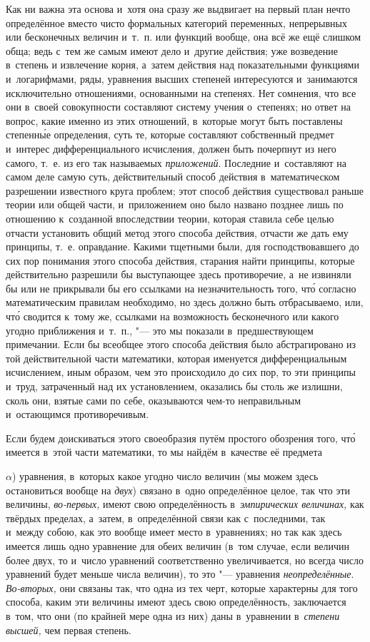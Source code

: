 Как ни важна эта основа и~хотя она сразу же выдвигает на первый план нечто
определённое вместо чисто формальных категорий переменных, непрерывных или
бесконечных величин и~т.~п. или функций вообще, она всё же ещё слишком обща;
ведь с~тем же самым имеют дело и~другие действия; уже возведение в~степень и
извлечение корня, а~затем действия над показательными функциями и~логарифмами,
ряды, уравнения высших степеней интересуются и~занимаются исключительно
отношениями, основанными на степенях. Нет сомнения, что все они в~своей
совокупности составляют систему учения о~степенях; но ответ на вопрос, какие
именно из этих отношений, в~которые могут быть поставлены степенн\'{ы}е
определения, суть те, которые составляют собственный предмет и~интерес
дифференциального исчисления, должен быть почерпнут из него самого, т.~е. из
его так называемых {\em приложений}. Последние и~составляют на самом деле самую
суть, действительный способ действия в~математическом разрешении известного
круга проблем; этот способ действия существовал раньше теории или общей части,
и~приложением оно было названо позднее лишь по отношению к~созданной
впоследствии теории, которая ставила себе целью отчасти установить общий метод
этого способа действия, отчасти же дать ему принципы, т.~е. оправдание. Какими
тщетными были, для господствовавшего до сих пор понимания этого способа
действия, старания найти принципы, которые действительно разрешили бы
выступающее здесь противоречие, а~не извиняли бы или не прикрывали бы его
ссылками на незначительность того, чт\'{о} согласно математическим правилам
необходимо, но здесь должно быть отбрасываемо, или, чт\'{о} сводится к~тому же,
ссылками на возможность бесконечного или какого угодно приближения и~т.~п.,
"--- это мы показали в~предшествующем примечании. Если бы всеобщее этого
способа действия было абстрагировано из той действительной части математики,
которая именуется дифференциальным исчислением, иным образом, чем это
происходило до сих пор, то эти принципы и~труд, затраченный над их
установлением, оказались бы столь же излишни, сколь они, взятые сами по себе,
оказываются чем-то неправильным и~остающимся противоречивым.

Если будем доискиваться этого своеобразия путём простого обозрения того,
чт\'{о} имеется в~этой части математики, то мы найдём в~качестве её предмета

$\alpha$) уравнения, в~которых какое угодно число величин (мы можем здесь
остановиться вообще на {\em двух}) связано в~одно определённое целое, так что
эти величины, {\em во-первых,} имеют свою определённость
в~{\em эмпирических величинах,} как твёрдых пределах, а~затем, в~определённой
связи как с~последними, так и~между собою, как это вообще имеет место
в~уравнениях; но так как здесь имеется лишь одно уравнение для обеих величин
(в~том случае, если величин более двух, то и~число уравнений соответственно
увеличивается, но всегда число уравнений будет меньше числа величин), то это
"--- уравнения {\em неопределённые}. {\em Во-вторых,} они связаны так, что одна
из тех черт, которые характерны для того способа, каким эти величины имеют
здесь свою определённость, заключается в~том, что они (по крайней мере одна из
них) даны в~уравнении в~{\em степени высшей,} чем первая степень.

